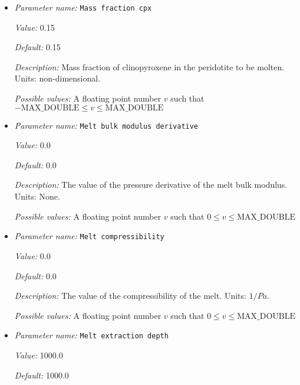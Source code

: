 \begin{itemize}
{\it Possible values:} A floating point number $v$ such that $0 \leq v \leq \text{MAX\_DOUBLE}$
\item {\it Parameter name:} {\tt Mass fraction cpx}
\label{parameters:Material model/Melt simple/Mass fraction cpx}


{\it Value:} 0.15


{\it Default:} 0.15


{\it Description:} Mass fraction of clinopyroxene in the peridotite to be molten. Units: non-dimensional.


{\it Possible values:} A floating point number $v$ such that $-\text{MAX\_DOUBLE} \leq v \leq \text{MAX\_DOUBLE}$
\item {\it Parameter name:} {\tt Melt bulk modulus derivative}
\label{parameters:Material model/Melt simple/Melt bulk modulus derivative}


{\it Value:} 0.0


{\it Default:} 0.0


{\it Description:} The value of the pressure derivative of the melt bulk modulus. Units: None.


{\it Possible values:} A floating point number $v$ such that $0 \leq v \leq \text{MAX\_DOUBLE}$
\item {\it Parameter name:} {\tt Melt compressibility}
\label{parameters:Material model/Melt simple/Melt compressibility}


{\it Value:} 0.0


{\it Default:} 0.0


{\it Description:} The value of the compressibility of the melt. Units: $1/Pa$.


{\it Possible values:} A floating point number $v$ such that $0 \leq v \leq \text{MAX\_DOUBLE}$
\item {\it Parameter name:} {\tt Melt extraction depth}
\label{parameters:Material model/Melt simple/Melt extraction depth}


{\it Value:} 1000.0


{\it Default:} 1000.0



\end{itemize}
